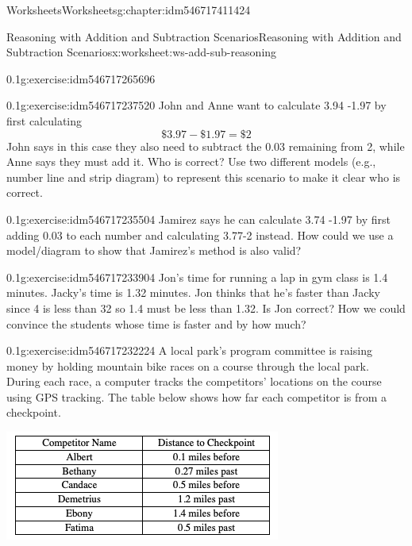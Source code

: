 \documentclass[twoside,11pt,]{book}
\begin{document}
\begin{chapterptx}{Worksheets}{}{Worksheets}{}{}{g:chapter:idm546717411424}
\begin{worksheet-section-numberless}{Reasoning with Addition and Subtraction Scenarios}{}{Reasoning with Addition and Subtraction Scenarios}{}{}{x:worksheet:ws-add-sub-reasoning}
\begin{divisionexercise}{1}{}{0.1}{g:exercise:idm546717265696}
\end{divisionexercise}%
\begin{divisionexercise}{2}{}{0.1}{g:exercise:idm546717237520}%
John and Anne want to calculate \textdollar{}3.94 -\textdollar{}1.97 by first calculating%
\begin{equation*}
\$3.97-\$1.97 = \$2 
\end{equation*}
John says in this case they also need to subtract the \textdollar{}0.03 remaining from \textdollar{}2, while Anne says they must add it.  Who is correct?  Use two different models (e.g., number line and strip diagram) to represent this scenario to make it clear who is correct.%
\end{divisionexercise}%
\begin{divisionexercise}{3}{}{0.1}{g:exercise:idm546717235504}%
Jamirez says he can calculate \textdollar{}3.74 -\textdollar{}1.97 by first adding \textdollar{}0.03 to each number and calculating \textdollar{}3.77-\textdollar{}2 instead.  How could we use a model\slash{}diagram to show that Jamirez’s method is also valid?%
\end{divisionexercise}%
\begin{divisionexercise}{4}{}{0.1}{g:exercise:idm546717233904}%
Jon’s time for running a lap in gym class is 1.4 minutes.  Jacky’s time is 1.32 minutes.  Jon thinks that he’s faster than Jacky since 4 is less than 32 so 1.4 must be less than 1.32.  Is Jon correct?  How we could convince the students whose time is faster and by how much?%
\end{divisionexercise}%
\begin{divisionexercise}{5}{}{0.1}{g:exercise:idm546717232224}%
A local park’s program committee is raising money by holding mountain bike races on a course through the local park.  During each race, a computer tracks the competitors’ locations on the course using GPS tracking.  The table below shows how far each competitor is from a checkpoint.%
\begin{sidebyside}{1}{0.05}{0.05}{0}%
\begin{sbspanel}{0.9}%
\includegraphics[width=1\linewidth]{images/reasoning-table-checkpoint.png}

\end{sbspanel}
\end{sidebyside}
\end{divisionexercise}
\end{worksheet-section-numberless}
\end{chapterptx}
\end{document}
